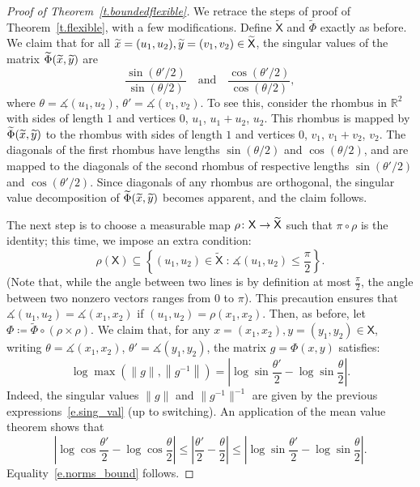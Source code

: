 \documentclass[AHL,Unicode,longabstracts,published]{cedram}
\newcommand{\R}{\mathbb{R}}
\newcommand{\sfX}{\mathsf{X}}
\newcommand{\st}{\;\mathord{:}\;}
\renewcommand{\angle}{\measuredangle}
\renewcommand*{\to}{\mathchoice{\longrightarrow}{\rightarrow}{\rightarrow}{\rightarrow}}
\let\oldtilde\tilde
\renewcommand*{\tilde}[1]{\mathchoice{\widetilde{#1}}{\widetilde{#1}}{\oldtilde{#1}}{\oldtilde{#1}}}
\newcommand{\R}{\mathbb{R}}
\begin{document}
\begin{proof}[Proof of Theorem~\ref{t.boundedflexible}]
We retrace the steps of proof of Theorem~\ref{t.flexible}, with a few modifications. Define $\widetilde{\sfX}$ and $\widetilde{\Phi}$ exactly as before. We claim that for all $\tilde{x} = (u_1,u_2), \tilde{y}=(v_1,v_2) \in \widetilde{\sfX}$, the singular values of the matrix $\widetilde{\Phi}(\tilde{x},\tilde{y})$ are
\begin{equation}\label{e.sing_val}
\frac{\sin (\theta'/2)}{\sin (\theta/2)} \quad \text{and} \quad
\frac{\cos (\theta'/2)}{\cos (\theta/2)},
\end{equation}
where $\theta = \angle(u_1,u_2)$, $\theta' = \angle(v_1,v_2)$. To see this, consider the rhombus in $\R^2$ with sides of length $1$ and vertices $0$, $u_1$, $u_1+u_2$, $u_2$. This rhombus is mapped by $\widetilde{\Phi}(\tilde{x},\tilde{y})$ to the rhombus with sides of length $1$ and vertices $0$, $v_1$, $v_1+v_2$, $v_2$. The diagonals of the first rhombus have lengths $\sin (\theta/2)$ and $\cos (\theta/2)$, and are mapped to the diagonals of the second rhombus of respective lengths $\sin (\theta'/2)$ and $\cos (\theta'/2)$. Since diagonals of any rhombus are orthogonal, the singular value decomposition of $\widetilde{\Phi}(\tilde{x},\tilde{y})$ becomes apparent, and the claim follows.

The next step is to choose a measurable map $\rho \colon \sfX \to \widetilde{\sfX}$ such that $\pi \circ \rho$ is the identity; this time, we impose an extra condition:
\begin{equation}
\rho(\sfX) \subseteq \left\{ (u_1,u_2) \in \widetilde{\sfX} \st \angle(u_1,u_2) \le \frac{\pi}{2} \right\}.
\end{equation}
(Note that, while the angle between two lines is by definition at most $\frac{\pi}{2}$, the angle between two nonzero vectors ranges from $0$ to $\pi$). This precaution ensures that $\angle(u_1,u_2) = \angle(x_1,x_2)$ if $(u_1,u_2) = \rho(x_1,x_2)$. Then, as before, let $\Phi \coloneqq \widetilde{\Phi}\circ (\rho \times \rho)$. We claim that, for any $x = (x_1,x_2), y = (y_1,y_2) \in \sfX$, writing $\theta = \angle(x_1,x_2)$, $\theta' = \angle(y_1,y_2)$, the matrix $g = \Phi(x,y)$ satisfies:
\begin{equation}\label{e.norms_bound}
\log \max \left(\|g\|, \left\|g^{-1}\right\| \right) =
\left| \log \sin \frac{\theta'}{2} - \log \sin \frac{\theta}{2} \right|.
\end{equation}
Indeed, the singular values $\|g\|$ and $\|g^{-1}\|^{-1}$ are given by the previous expressions~\eqref{e.sing_val} (up to switching). An application of the mean value theorem shows that
\begin{equation}
\left| \log \cos \frac{\theta'}{2} - \log \cos \frac{\theta}{2} \right| \le
\left| \frac{\theta'}{2} - \frac{\theta}{2} \right| \le
\left| \log \sin \frac{\theta'}{2} - \log \sin \frac{\theta}{2} \right|.
\end{equation}
Equality~\eqref{e.norms_bound} follows.


\end{proof}
\end{document}
